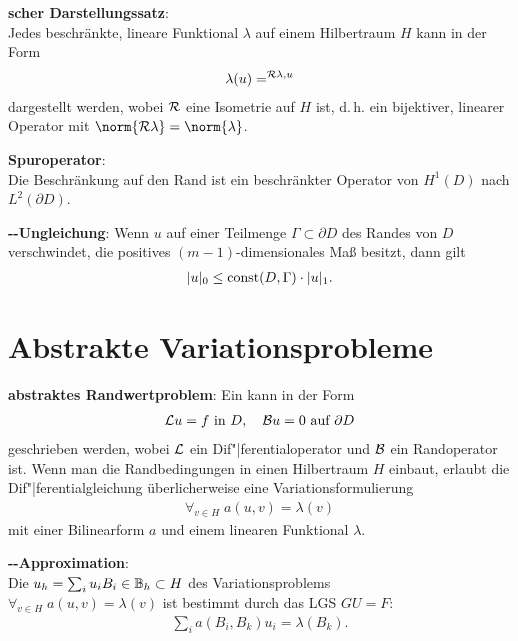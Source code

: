 \linie

\textbf{scher Darstellungssatz}:\\
Jedes beschränkte, lineare Funktional $\lambda$ auf einem Hilbertraum $H$ kann in der Form
\begin{align*}
    \lambda(u) = \sp{\mathcal{R}\lambda, u}
\end{align*}
dargestellt werden, wobei $\mathcal{R}$ eine Isometrie auf $H$ ist,
d.\,h. ein bijektiver, linearer Operator mit $\norm{\R\lambda} = \norm{\lambda}$.

\linie

\textbf{Spuroperator}:\\
Die Beschränkung auf den Rand ist ein beschränkter Operator von $H^1(D)$ nach $L^2(\partial D)$.

\linie

\textbf{--Ungleichung}:
Wenn $u$ auf einer Teilmenge $\Gamma \subset \partial D$ des Randes von $D$ verschwindet,
die positives $(m - 1)$-dimensionales Maß besitzt, dann gilt
\begin{align*}
    |u|_0 \le \operatorname{const}(D, \Gamma) \cdot |u|_1.
\end{align*}

\pagebreak

\section{%
    Abstrakte Variationsprobleme%
}

\textbf{abstraktes Randwertproblem}:
Ein  kann in der Form
\begin{align*}
    \mathcal{L} u = f \text{ in } D,\quad
    \mathcal{B} u = 0 \text{ auf } \partial D
\end{align*}
geschrieben werden, wobei $\mathcal{L}$ ein Dif"|ferentialoperator und $\mathcal{B}$ ein Randoperator ist.
Wenn man die Randbedingungen in einen Hilbertraum $H$ einbaut, erlaubt die Dif"|ferentialgleichung
überlicherweise eine Variationsformulierung
\begin{align*}
    \forall_{v \in H}\; a(u, v) = \lambda(v)
\end{align*}
mit einer Bilinearform $a$ und einem linearen Funktional $\lambda$.

\linie

\textbf{--Approximation}:\\
Die  $u_h = \sum_i u_i B_i \in \mathbb{B}_h \subset H$
des Variationsproblems\\
$\forall_{v \in H}\; a(u, v) = \lambda(v)$
ist bestimmt durch das LGS $GU = F$:
\begin{align*}
    \sum_i a(B_i, B_k) u_i = \lambda(B_k).
\end{align*}

